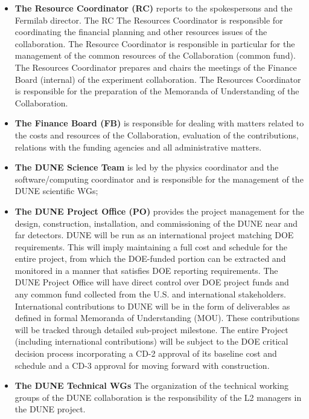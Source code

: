 \begin{itemize}
       \item {\bf The Resource Coordinator (RC)} reports to the spokespersons and the Fermilab director. The RC
    The Resources Coordinator is responsible for coordinating the financial planning and other
resources issues of the collaboration. The Resource Coordinator is responsible in particular for
the management of the common resources of the Collaboration (common fund).
The Resources Coordinator prepares and chairs the meetings of the Finance Board (internal) of
the experiment collaboration. The Resources Coordinator is responsible for the
preparation of the Memoranda of Understanding of the Collaboration.
    \item{\bf The Finance Board (FB)} is responsible for dealing with matters related to
the costs and resources of the Collaboration, evaluation of the contributions, relations with the
funding agencies and all administrative matters.  
    \item{\bf The DUNE Science Team} is led by the physics coordinator and the software/computing coordinator and is responsible for the management of the DUNE scientific WGs;
    \item{\bf The DUNE Project Office (PO)} provides the project management for the design, construction, installation, and commissioning of the DUNE near and far detectors. DUNE will be run as an international project matching DOE requirements. This will imply maintaining a full cost and schedule for the entire project, from which the DOE-funded portion can be extracted and monitored in a manner that satisfies DOE reporting requirements. The DUNE Project Office will have direct control over DOE project funds and any common fund collected from the U.S. and international stakeholders. International contributions to DUNE will be in the form of deliverables as defined in formal Memoranda of Understanding (MOU). These contributions will be tracked through detailed sub-project milestone. The entire Project (including international contributions) will be subject to the DOE critical decision process incorporating a CD-2 approval of its baseline cost and schedule and a CD-3 approval for moving forward with construction.  
    \item{\bf The DUNE Technical WGs} The organization of the technical working groups of the DUNE collaboration is the responsibility of the L2 managers in the DUNE project.
\end{itemize}







